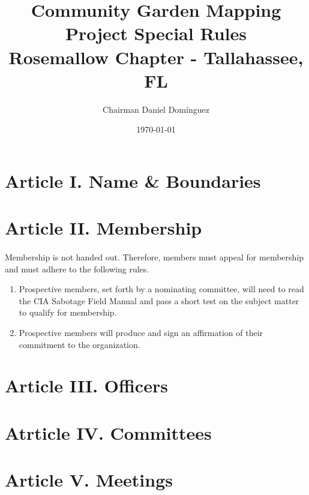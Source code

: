 \documentclass[letterpaper,10pt]{article}
\title{\textbf{{\Large Community Garden Mapping Project Special Rules \\ Rosemallow Chapter - Tallahassee, FL}}}
\author{Chairman Daniel Dom\'inguez}
\date{\today}
\begin{document}
\maketitle

\section*{ Article I. Name \& Boundaries }

\section*{Article II. Membership}
\paragraph{} Membership is not handed out. Therefore, members must appeal for membership and must adhere to the following rules.
\begin{enumerate}[label=(\roman*)]
\item Prospective members, set forth by a nominating committee, will need to read the CIA Sabotage Field Manual and pass a short test on the subject matter to qualify for membership.
\item Prospective members will produce and sign an affirmation of their commitment to the organization. 

\end{enumerate}

\section*{Article III. Officers}

\section*{Atrticle IV. Committees}

\section*{Article V. Meetings}
\end{document}
